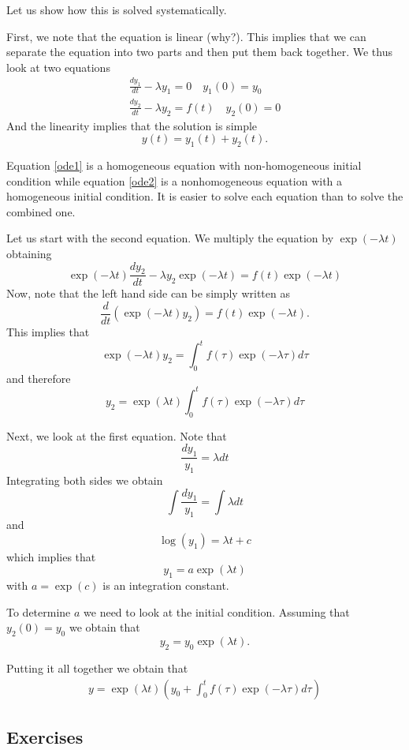 \documentclass[12pt,legal]{article}
\begin{document}
Let us show how this is solved systematically.

First, we note that the equation is linear (why?). This implies that we can separate the equation into two parts and then put them back together.
We thus look at two equations
\begin{subequations}
\label{tp}
\begin{eqnarray}
\label{ode1}
 {\frac {dy_1}{dt}} - \lambda y_1   = 0 \quad y_1(0) = y_0\\
 \label{ode2}
  {\frac {dy_2}{dt}} - \lambda y_2 = f(t) \quad y_2(0) = 0
\end{eqnarray}
\end{subequations}
And the linearity implies that the solution is simple
$$ y(t) = y_1(t) + y_2(t).$$

Equation \eqref{ode1} is a homogeneous equation with non-homogeneous initial condition while equation \eqref{ode2} is a nonhomogeneous equation with a homogeneous initial condition. It is easier to solve each equation than to solve the combined one. 

Let us start with the second equation. 
We multiply the equation by $\exp(-\lambda t)$ obtaining
$$   \exp(-\lambda t){\frac {dy_2}{dt}} - \lambda y_2 \exp(-\lambda t) = f(t)\exp(-\lambda t) $$
Now, note that the left hand side can be simply written as
$${\frac d {dt}}  \left(\exp(-\lambda t)y_2 \right) = f(t)\exp(-\lambda t). $$
This implies that
$$ \exp(-\lambda t)y_2 = \int_0^t f(\tau)\exp(-\lambda \tau) d\tau $$
and therefore
$$y_2 = \exp(\lambda t)\int_0^t f(\tau)\exp(-\lambda \tau) d\tau $$


Next, we look at the first equation. Note that
$$  {\frac {dy_1}{y_1}} = \lambda dt  $$ 
Integrating both sides we obtain
$$  \int {\frac {dy_1}{y_1}} = \int \lambda dt  $$
and
$$ \log(y_1)  = \lambda t + c $$
which implies that
$$ y_1 = a \exp(\lambda t) $$
with $a = \exp(c)$ is an integration constant.

To determine $a$ we need to look at the initial condition.
Assuming that $y_2(0) = y_0$ we obtain that
$$ y_2 = y_0\exp(\lambda t).$$

Putting it all together we obtain that 
\begin{eqnarray}
y =  \exp(\lambda t) \left( y_0 + \int_0^t f(\tau)\exp(-\lambda \tau) d\tau  \right)
\end{eqnarray}


\subsection{Exercises}
\end{document}
